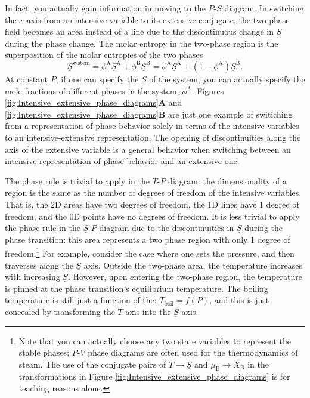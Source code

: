 \documentclass[12pt]{article}
\begin{document}
In fact, you actually gain information in moving to the $P$-$\underline{S}$ diagram. In switching the $x$-axis from an intensive variable to its extensive conjugate, the two-phase field becomes an area instead of a line due to the discontinuous change in $\underline{S}$ during the phase change. The molar entropy in the two-phase region is the superposition of the molar entropies of the two phases
\begin{equation}
	\underline{S}^{\text{system}}= \phi^{\text{A}}\underline{S}^{\text{A}}+\phi^{\text{B}}\underline{S}^{\text{B}}=\phi^{\text{A}}\underline{S}^{\text{A}}+\left(1-\phi^{\text{A}}\right) \underline{S}^{\text{B}}.
\end{equation}
At constant $P$, if one can specify the $\underline{S}$ of the system, you can actually specify the mole fractions of different phases in the system, $\phi^{\text{A}}$. Figures \ref{fig:Intensive_extensive_phase_diagrams}\textbf{A} and \ref{fig:Intensive_extensive_phase_diagrams}\textbf{B} are just one example of switiching from a representation of phase behavior solely in terms of the intensive variables to an intensive-extensive representation. The opening of discontinuities along the axis of the extensive variable is a general behavior when switching between an intensive representation of phase behavior and an extensive one. 

The phase rule is trivial to apply in the $T$-$P$ diagram: the dimensionality of a region is the same as the number of degrees of freedom of the intensive variables. That is, the 2D areas have two degrees of freedom, the 1D lines have 1 degree of freedom, and the 0D points have no degrees of freedom. It is less trivial to apply the phase rule in the $\underline{S}$-$P$ diagram due to the discontinuities in $\underline{S}$ during the phase transition: this area represents a two phase region with only 1 degree of freedom.\footnote{Note that you can actually choose any two state variables to represent the stable phases; $P$-$V$ phase diagrams are often used for the thermodynamics of steam. The use of the conjugate pairs of $T\to \underline{S}$ and $\mu_\text{B}\to X_\text{B}$ in the transformations in Figure \ref{fig:Intensive_extensive_phase_diagrams} is for teaching reasons alone.} For example, consider the case where one sets the pressure, and then traverses along the \(\underline{S}\) axis. Outside the two-phase area, the temperature increases with increasing \(\underline{S}\). However, upon entering the two-phase region, the temperature is pinned at the phase transition's equilibrium temperature. The boiling temperature is still just a function of the: \(T_{\text{boil}}=f(P)\), and this is just concealed by transforming the \(T\) axis into the \(\underline{S}\) axis.
\end{document}
